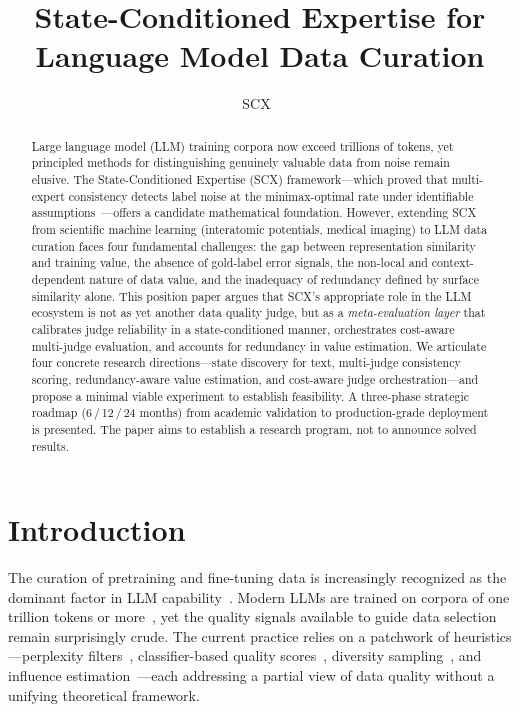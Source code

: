 \documentclass[11pt,twocolumn]{article}
\title{State-Conditioned Expertise for Language Model Data Curation}
\author{SCX\ }
\begin{document}
\maketitle

\begin{abstract}
Large language model (LLM) training corpora now exceed trillions of tokens, yet principled methods for distinguishing genuinely valuable data from noise remain elusive. The State-Conditioned Expertise (SCX) framework---which proved that multi-expert consistency detects label noise at the minimax-optimal rate under identifiable assumptions~\cite{scx2026}---offers a candidate mathematical foundation. However, extending SCX from scientific machine learning (interatomic potentials, medical imaging) to LLM data curation faces four fundamental challenges: the gap between representation similarity and training value, the absence of gold-label error signals, the non-local and context-dependent nature of data value, and the inadequacy of redundancy defined by surface similarity alone. This position paper argues that SCX's appropriate role in the LLM ecosystem is not as yet another data quality judge, but as a \textit{meta-evaluation layer} that calibrates judge reliability in a state-conditioned manner, orchestrates cost-aware multi-judge evaluation, and accounts for redundancy in value estimation. We articulate four concrete research directions---state discovery for text, multi-judge consistency scoring, redundancy-aware value estimation, and cost-aware judge orchestration---and propose a minimal viable experiment to establish feasibility. A three-phase strategic roadmap (6\,/\,12\,/\,24 months) from academic validation to production-grade deployment is presented. The paper aims to establish a research program, not to announce solved results.
\end{abstract}

\section{Introduction}

The curation of pretraining and fine-tuning data is increasingly recognized as the dominant factor in LLM capability~\cite{gunasekar2023textbooks,zhou2024web,Brown2020}. Modern LLMs are trained on corpora of one trillion tokens or more~\cite{raffel2020,gao2020pile}, yet the quality signals available to guide data selection remain surprisingly crude. The current practice relies on a patchwork of heuristics---perplexity filters~\cite{wenzek2020quality}, classifier-based quality scores~\cite{penedo2023refinedweb}, diversity sampling~\cite{xie2023dsir}, and influence estimation~\cite{pruthi2020estimating,koh2017influence}---each addressing a partial view of data quality without a unifying theoretical framework.
\end{document}
